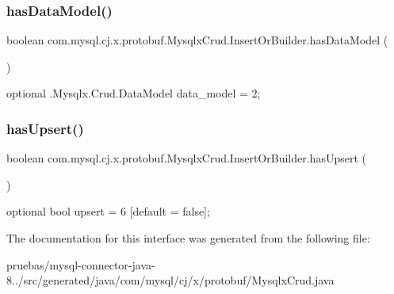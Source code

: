 \subsubsection{\texorpdfstring{has\+Data\+Model()}{hasDataModel()}}
{\footnotesize\ttfamily boolean com.\+mysql.\+cj.\+x.\+protobuf.\+Mysqlx\+Crud.\+Insert\+Or\+Builder.\+has\+Data\+Model (\begin{DoxyParamCaption}{ }\end{DoxyParamCaption})}

{\ttfamily optional .Mysqlx.\+Crud.\+Data\+Model data\+\_\+model = 2;} \mbox{\label{interfacecom_1_1mysql_1_1cj_1_1x_1_1protobuf_1_1_mysqlx_crud_1_1_insert_or_builder_a5558110d233d20c698cb759e135490b6}} 
\subsubsection{\texorpdfstring{has\+Upsert()}{hasUpsert()}}
{\footnotesize\ttfamily boolean com.\+mysql.\+cj.\+x.\+protobuf.\+Mysqlx\+Crud.\+Insert\+Or\+Builder.\+has\+Upsert (\begin{DoxyParamCaption}{ }\end{DoxyParamCaption})}

{\ttfamily optional bool upsert = 6 \mbox{[}default = false\mbox{]};} 

The documentation for this interface was generated from the following file\+:\begin{DoxyCompactItemize}
\item 
pruebas/mysql-\/connector-\/java-\/8../src/generated/java/com/mysql/cj/x/protobuf/Mysqlx\+Crud.\+java\end{DoxyCompactItemize}
